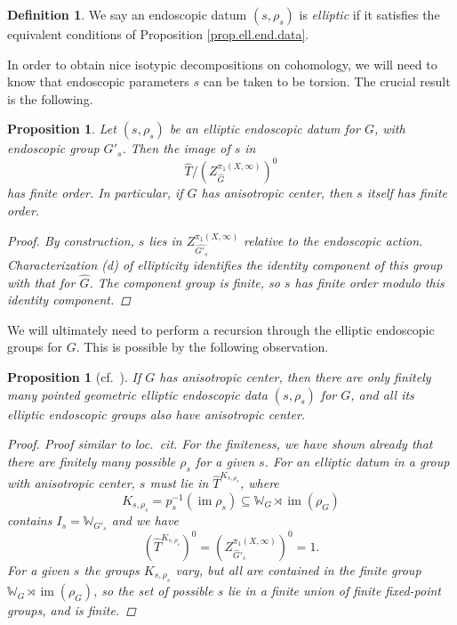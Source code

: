 \documentclass[openany]{amsbook}
\newtheorem{proposition}[theorem]{Proposition}
\theoremstyle{definition}
\newtheorem{definition}[theorem]{Definition}
\theoremstyle{remark}
\numberwithin{equation}{section}
\newcommand{\W}{\mathbb{W}}
\newcommand{\im}{\operatorname{im}}
\renewcommand{\-}{\operatorname{-}}
\begin{document}
\begin{definition}\label{def.ell.end.datum}
    We say an endoscopic datum $(s, \rho_s)$ is \emph{elliptic} if it satisfies the equivalent conditions of Proposition \ref{prop.ell.end.data}. 
\end{definition}

In order to obtain nice isotypic decompositions on cohomology, we will need to know that endoscopic parameters $s$ can be taken to be torsion. The crucial result is the following.

\begin{proposition}\label{prop.ell.end.torsion}
    Let $(s, \rho_s)$ be an elliptic endoscopic datum for $G$, with endoscopic group $G'_s$. Then the image of $s$ in
    $$
        \widehat{T}/(Z_{\widehat{G}}^{\pi_1(X, \infty)})^0
    $$
    has finite order. In particular, if $G$ has anisotropic center, then $s$ itself has finite order. 
    \begin{proof}
        By construction, $s$ lies in $Z_{\widehat{G'_s}}^{\pi_1(X, \infty)}$ relative to the endoscopic action. Characterization (d) of ellipticity identifies the identity component of this group with that for $\widehat{G}$. The component group is finite, so $s$ has finite order modulo this identity component. 
    \end{proof}
\end{proposition}

We will ultimately need to perform a recursion through the elliptic endoscopic groups for $G$. This is possible by the following observation.

\begin{proposition}[{{cf.\ \cite[Remarque 10.6.7, Proposition 10.6.10, Remarque 10.7.2]{CLII}}}]\label{prop.ell.end.finite}
    If $G$ has anisotropic center, then there are only finitely many pointed geometric elliptic endoscopic data $(s, \rho_s)$ for $G$, and all its elliptic endoscopic groups also have anisotropic center.
    \begin{proof}
        Proof similar to \textit{loc.\ cit.} For the finiteness, we have shown already that there are finitely many possible $\rho_s$ for a given $s$. For an elliptic datum in a group with anisotropic center, $s$ must lie in 
        $\widehat{T}^{K_{s, \rho_s}}$, where $$K_{s, \rho_s} = p_s^{-1}(\im \rho_s) \subseteq \W_G \rtimes \im(\rho_G)$$
        contains $I_s = \W_{G'_s}$ and we have
        $$
            \left(\widehat{T}^{K_{s, \rho_s}} \right)^0 = \left(Z_{\widehat{G}'_s}^{\pi_1(X, \infty)} \right)^0 = 1.
        $$
        For a given $s$ the groups $K_{s, \rho_s}$ vary, but all are contained in the finite group $\W_G \rtimes \im(\rho_G)$, so the set of possible $s$ lie in a finite union of finite fixed-point groups, and is finite. 
    \end{proof}
\end{proposition}
\end{document}
